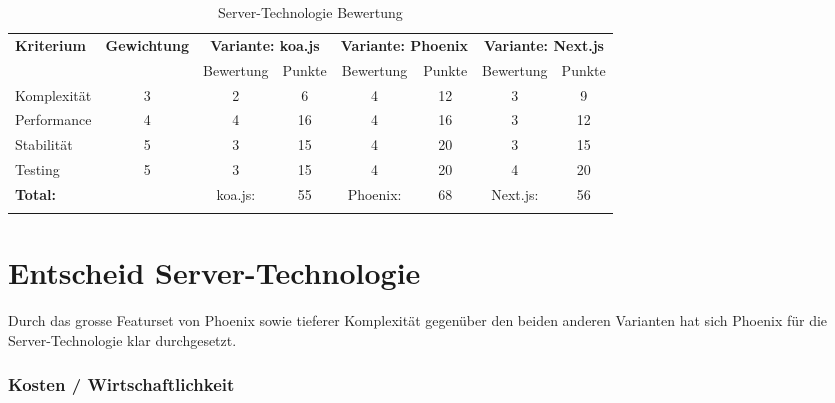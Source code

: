 \begin{longtable}[]{@{}p{2cm}ccccccc@{}}
  \toprule
  \textbf{Kriterium} & \textbf{Gewichtung} & \multicolumn{2}{c}{\textbf{Variante: koa.js}} & \multicolumn{2}{c}{\textbf{Variante: Phoenix}} & \multicolumn{2}{c}{\textbf{Variante: Next.js}}\tabularnewline
                     &                     & Bewertung                                     & Punkte                                         & Bewertung                                                     & Punkte & Bewertung & Punkte \tabularnewline
  \midrule
  \endhead
  Komplexität        & 3                   & 2                                             & 6                                              & 4                                                             & 12     & 3         & 9 \tabularnewline
  Performance        & 4                   & 4                                             & 16                                             & 4                                                             & 16     & 3         & 12 \tabularnewline
  Stabilität         & 5                   & 3                                             & 15                                             & 4                                                             & 20     & 3         & 15 \tabularnewline
  Testing            & 5                   & 3                                             & 15                                             & 4                                                             & 20     & 4         & 20 \tabularnewline
  \midrule
  \textbf{Total:}    &                     & koa.js:                                       & 55                                             & Phoenix:                                                      & 68     & Next.js:  & 56 \tabularnewline
  \bottomrule
  \caption{Server-Technologie Bewertung}
\end{longtable}

\section{Entscheid Server-Technologie}\label{entscheid-server-technologie}

Durch das grosse Featurset von Phoenix sowie tieferer Komplexität gegenüber den
beiden anderen Varianten hat sich Phoenix für die Server-Technologie klar
durchgesetzt.

\subsubsection{Kosten / Wirtschaftlichkeit}

